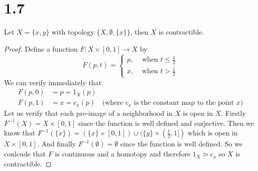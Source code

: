\documentclass{article}
\theoremstyle{definition}
\begin{document}
\section*{1.7}
    \begin{mdframed}[]
        Let $X = \{x,y\}$ with topology $\{X, \emptyset, \{x\}\}$, then $X$ is contractible.
    \end{mdframed}
    \begin{proof}
        Define a function $F:X \times [0,1] \rightarrow X$ by 
        \[
            F(p,t) = 
            \begin{cases}
                p, & \text{ when } t \leq \frac{1}{2}\\
                x, & \text{ when } t > \frac{1}{2}
            \end{cases}
        \]
        We can verify immediately that 
        \begin{align*}
            F(p,0) &= p = 1_X(p)\\
            F(p,1) &= x = c_x(p) & \text{(where $c_x$ is the constant map to the point $x$)}
        \end{align*}
        Let us verify that each pre-image of a neighborhood in $X$ is open in $X$.
        Firstly $F^{-1}(X) = X \times [0,1]$ since the function is well defined and surjective.
        Then we know that $F^{-1}(\{x\}) = (\{x\} \times [0,1]) \cup (\{y\} \times (\frac{1}{2}, 1])$ which is open 
        in $X \times [0,1]$. And finally $F^{-1}(\emptyset) = \emptyset$ since the function is well defined.
        So we conlcude that $F$ is continuous and a homotopy and therefore $1_X \simeq c_x$ so $X$ is contractible.
    \end{proof}
\end{document}
